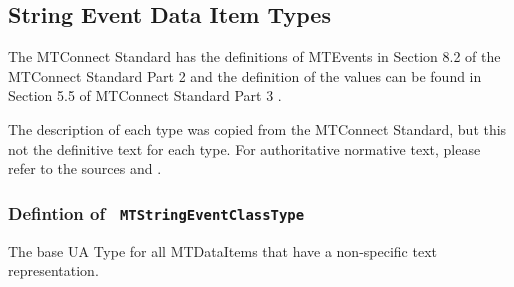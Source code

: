 \FloatBarrier
\subsection{String Event Data Item Types} \label{model:StringEventDataItemTypes}

The MTConnect Standard has the definitions of \glspl{MTEvent} in 
Section 8.2 of the MTConnect Standard Part 2 \cite{MTCPart2} and the definition of the values 
can be found in Section 5.5 of MTConnect Standard Part 3 \cite{MTCPart3}. 

The description of each type was copied from the MTConnect Standard,
but this not the definitive text for each type. For authoritative normative text, 
please refer to the sources \cite{MTCPart2} and \cite{MTCPart3}.


\subsubsection{Defintion of \texttt{ MTStringEventClassType}}
  \label{type:MTStringEventClassType}

\FloatBarrier

The base UA \gls{Type} for all \glspl{MTDataItem} that have a non-specific text representation.


